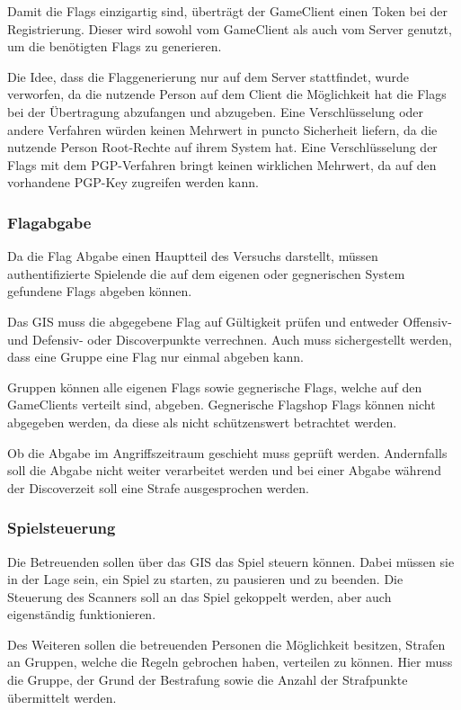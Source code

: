 Damit die Flags einzigartig sind, überträgt der GameClient einen Token bei der Registrierung. Dieser wird sowohl vom GameClient als auch vom Server genutzt, um die benötigten Flags zu generieren.

Die Idee, dass die Flaggenerierung nur auf dem Server stattfindet, wurde verworfen, da die nutzende Person auf dem Client die Möglichkeit hat die Flags bei der Übertragung abzufangen und abzugeben. Eine Verschlüsselung oder andere Verfahren würden keinen Mehrwert in puncto Sicherheit liefern, da die nutzende Person Root-Rechte auf ihrem System hat. Eine Verschlüsselung der Flags mit dem PGP-Verfahren bringt keinen wirklichen Mehrwert, da auf den vorhandene PGP-Key zugreifen werden kann. 

\subsubsection{Flagabgabe}

Da die Flag Abgabe einen Hauptteil des Versuchs darstellt, müssen authentifizierte Spielende die auf dem eigenen oder gegnerischen System gefundene Flags abgeben können.

Das GIS muss die abgegebene Flag auf Gültigkeit prüfen und entweder Offensiv- und \linebreak
Defensiv- oder Discoverpunkte verrechnen. Auch muss sichergestellt werden, dass eine Gruppe eine Flag nur einmal abgeben kann.

Gruppen können alle eigenen Flags sowie gegnerische Flags, welche auf den GameClients verteilt sind, abgeben. Gegnerische Flagshop Flags können nicht abgegeben werden, da diese als nicht schützenswert betrachtet werden.

Ob die Abgabe im Angriffszeitraum geschieht muss geprüft werden. Andernfalls soll die Abgabe nicht weiter verarbeitet werden und bei einer Abgabe während der Discoverzeit soll eine Strafe ausgesprochen werden.


\subsubsection{Spielsteuerung}

Die Betreuenden sollen über das GIS das Spiel steuern können. Dabei müssen sie in der Lage sein, ein Spiel zu starten, zu pausieren und zu beenden. Die Steuerung des Scanners soll an das Spiel gekoppelt werden, aber auch eigenständig funktionieren.

Des Weiteren sollen die betreuenden Personen die Möglichkeit besitzen, Strafen an Gruppen, welche die Regeln gebrochen haben, verteilen zu können. Hier muss die Gruppe, der Grund der Bestrafung sowie die Anzahl der Strafpunkte übermittelt werden.

